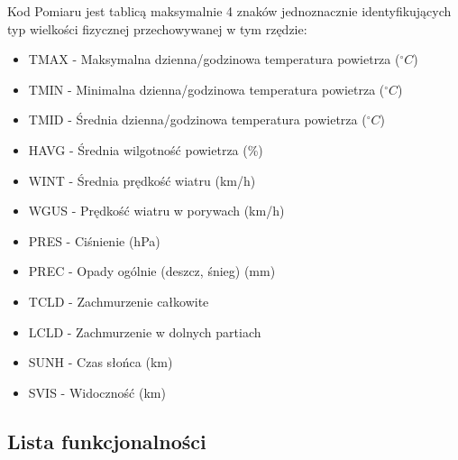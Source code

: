 \documentclass[12pt,a4paper]{article}
\begin{document}
Kod Pomiaru jest tablicą maksymalnie 4 znaków jednoznacznie identyfikujących typ wielkości fizycznej przechowywanej w tym rzędzie:
\begin{itemize}
\item TMAX - Maksymalna dzienna/godzinowa temperatura powietrza ($^\circ C$)
\item TMIN - Minimalna dzienna/godzinowa temperatura powietrza ($^\circ C$)
\item TMID - Średnia dzienna/godzinowa temperatura powietrza ($^\circ C$)
\item HAVG - Średnia wilgotność powietrza (\%)
\item WINT - Średnia prędkość wiatru (km/h)
\item WGUS - Prędkość wiatru w porywach (km/h)
\item PRES - Ciśnienie (hPa)
\item PREC - Opady ogólnie (deszcz, śnieg) (mm)
\item TCLD - Zachmurzenie całkowite
\item LCLD - Zachmurzenie w dolnych partiach
\item SUNH - Czas słońca (km)
\item SVIS - Widoczność (km)
\end{itemize}
\newpage
\subsection{Lista funkcjonalności}
\begin{table}[!htb]
\centering
\caption{Poziomy kompetencji klientów} 
\end{table}

\begin{table}[!htb]
\centering 
\end{table}
\end{document}
